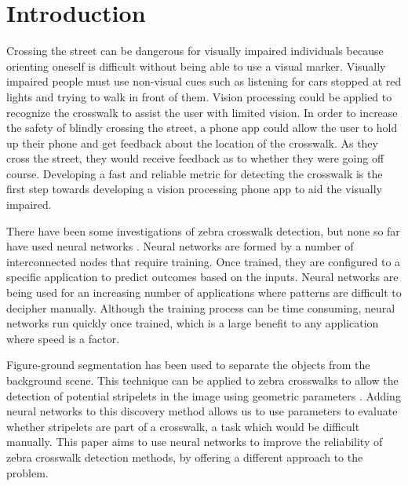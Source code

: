 \chapter{Introduction}
\label{intro}

Crossing the street can be dangerous for visually impaired individuals because orienting oneself is difficult without being able to use a visual marker. Visually impaired people must use non-visual cues such as listening for cars stopped at red lights and trying to walk in front of them. Vision processing could be applied to recognize the crosswalk to assist the user with limited vision. In order to increase the safety of blindly crossing the street, a phone app could allow the user to hold up their phone and get feedback about the location of the crosswalk. As they cross the street, they would receive feedback as to whether they were going off course. Developing a fast and reliable metric for detecting the crosswalk is the first step towards developing a vision processing phone app to aid the visually impaired.

There have been some investigations of zebra crosswalk detection, but none so far have used neural networks \cite{Coughlan2006}\cite{ZebraPhone}\cite{relatedworkbipolarity}. Neural networks are formed by a number of interconnected nodes that require training. Once trained, they are configured to a specific application to predict outcomes based on the inputs. Neural networks are being used for an increasing number of applications where patterns are difficult to decipher manually. Although the training process can be time consuming, neural networks run quickly once trained, which is a large benefit to any application where speed is a factor. 

Figure-ground segmentation has been used to separate the objects from the background scene. This technique can be applied to zebra crosswalks to allow the detection of potential stripelets in the image using geometric parameters \cite{Coughlan2006}. Adding neural networks to this discovery method allows us to use parameters to evaluate whether stripelets are part of a crosswalk, a task which would be difficult manually. This paper aims to use neural networks to improve the reliability of zebra crosswalk detection methods, by offering a different approach to the problem.